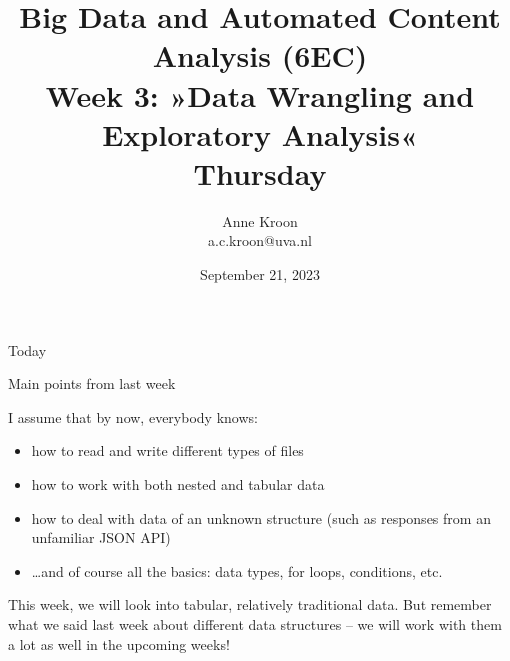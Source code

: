 

\graphicspath{{../../resources/img/}}




\title[Big Data and Automated Content Analysis]{\textbf{Big Data and Automated Content Analysis (6EC)} 
\\Week 3: »Data Wrangling and Exploratory Analysis«
\\Thursday}
\author[Anne Kroon]{Anne Kroon\\ \footnotesize{a.c.kroon@uva.nl \\}}
\date{September 21, 2023}


\begin{frame}{}
	\titlepage
\end{frame}

\begin{frame}{Today}
	\tableofcontents
\end{frame}



\begin{frame}{Main points from last week}

\begin{alertblock}{I assume that by now, everybody knows:}
\begin{itemize}
\item how to read and write different types of files
\item how to work with both nested and tabular data
\item how to deal with data of an unknown structure (such as responses from an unfamiliar JSON API)
\item \ldots and of course all the basics: data types, for loops, conditions, etc.
\end{itemize}
\end{alertblock}
\end{frame}

\begin{frame}[standout]
This week, we will look into tabular, relatively traditional data. But remember what we said last week about different data structures -- we will work with them a lot as well in the upcoming weeks!
\end{frame}







